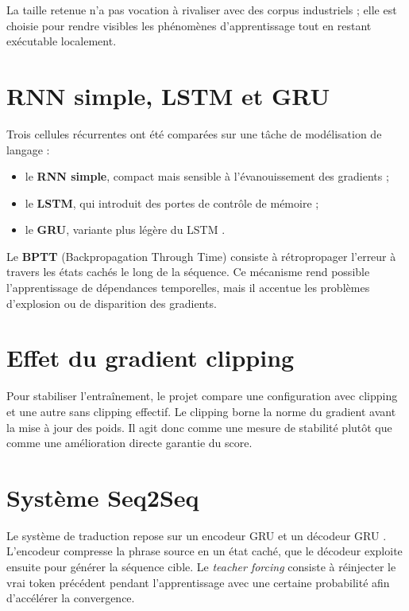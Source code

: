 \begin{table}[H]
    \centering
    \caption{Résumé du sous-corpus utilisé pour la partie séquentielle.}
\end{table}
La taille retenue n’a pas vocation à rivaliser avec des corpus industriels ; elle est choisie pour rendre visibles les phénomènes d’apprentissage tout en restant exécutable localement.

\section{RNN simple, LSTM et GRU}
Trois cellules récurrentes ont été comparées sur une tâche de modélisation de langage :
\begin{itemize}[leftmargin=1.2cm]
    \item le \textbf{RNN simple}, compact mais sensible à l’évanouissement des gradients ;
    \item le \textbf{LSTM}, qui introduit des portes de contrôle de mémoire \citep{hochreiter1997long} ;
    \item le \textbf{GRU}, variante plus légère du LSTM \citep{cho2014learning}.
\end{itemize}
Le \textbf{BPTT} (Backpropagation Through Time) consiste à rétropropager l’erreur à travers les états cachés le long de la séquence. Ce mécanisme rend possible l’apprentissage de dépendances temporelles, mais il accentue les problèmes d’explosion ou de disparition des gradients.

\section{Effet du gradient clipping}
Pour stabiliser l’entraînement, le projet compare une configuration avec clipping et une autre sans clipping effectif. Le clipping borne la norme du gradient avant la mise à jour des poids. Il agit donc comme une mesure de stabilité plutôt que comme une amélioration directe garantie du score.

\section{Système Seq2Seq}
Le système de traduction repose sur un encodeur GRU et un décodeur GRU \citep{sutskever2014sequence}. L’encodeur compresse la phrase source en un état caché, que le décodeur exploite ensuite pour générer la séquence cible. Le \emph{teacher forcing} consiste à réinjecter le vrai token précédent pendant l’apprentissage avec une certaine probabilité afin d’accélérer la convergence.

